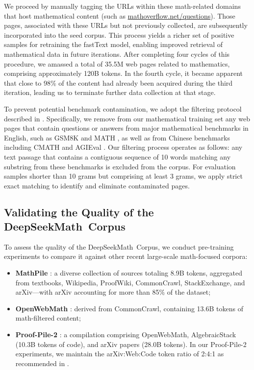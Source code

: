 \begin{itemize}[topsep=0pt]
We proceed by manually tagging the URLs within these math-related domains that host mathematical content (such as \url{mathoverflow.net/questions}). Those pages, associated with these URLs but not previously collected, are subsequently incorporated into the seed corpus. This process yields a richer set of positive samples for retraining the fastText model, enabling improved retrieval of mathematical data in future iterations. After completing four cycles of this procedure, we amassed a total of 35.5M web pages related to mathematics, comprising approximately 120B tokens. In the fourth cycle, it became apparent that close to 98\% of the content had already been acquired during the third iteration, leading us to terminate further data collection at that stage.

To prevent potential benchmark contamination, we adopt the filtering protocol described in \cite{deepseek-coder}. Specifically, we remove from our mathematical training set any web pages that contain questions or answers from major mathematical benchmarks in English, such as GSM8K \citep{gsm8k} and MATH \citep{MATH}, as well as from Chinese benchmarks including CMATH \citep{wei2023cmath} and AGIEval \citep{agieval}. Our filtering process operates as follows: any text passage that contains a contiguous sequence of 10 words matching any substring from these benchmarks is excluded from the corpus. For evaluation samples shorter than 10 grams but comprising at least 3 grams, we apply strict exact matching to identify and eliminate contaminated pages.

\subsection{Validating the Quality of the DeepSeekMath~Corpus}

To assess the quality of the DeepSeekMath~Corpus, we conduct pre-training experiments to compare it against other recent large-scale math-focused corpora:

\begin{itemize}[topsep=0pt]
    \item \textbf{MathPile} \citep{mathpile}: a diverse collection of sources totaling 8.9B tokens, aggregated from textbooks, Wikipedia, ProofWiki, CommonCrawl, StackExchange, and arXiv—with arXiv accounting for more than 85\% of the dataset;
    \item \textbf{OpenWebMath} \citep{openwebmath}: derived from CommonCrawl, containing 13.6B tokens of math-filtered content;
    \item \textbf{Proof-Pile-2} \citep{llemma}: a compilation comprising OpenWebMath, AlgebraicStack (10.3B tokens of code), and arXiv papers (28.0B tokens). In our Proof-Pile-2 experiments, we maintain the arXiv:Web:Code token ratio of 2:4:1 as recommended in \cite{llemma}.
\end{itemize}


\end{itemize}
